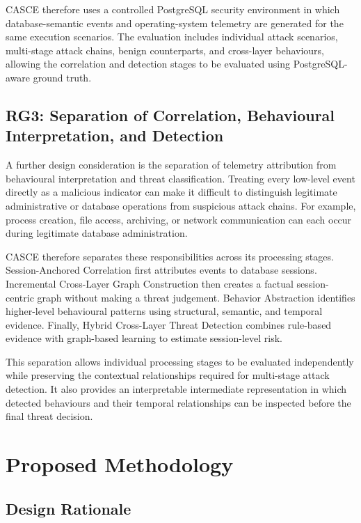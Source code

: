 \documentclass[conference]{IEEEtran}
\begin{document}
CASCE therefore uses a controlled PostgreSQL security environment in which database-semantic events and operating-system telemetry are generated for the same execution scenarios. The evaluation includes individual attack scenarios, multi-stage attack chains, benign counterparts, and cross-layer behaviours, allowing the correlation and detection stages to be evaluated using PostgreSQL-aware ground truth.

\subsection{RG3: Separation of Correlation, Behavioural Interpretation, and Detection}

A further design consideration is the separation of telemetry attribution from behavioural interpretation and threat classification. Treating every low-level event directly as a malicious indicator can make it difficult to distinguish legitimate administrative or database operations from suspicious attack chains. For example, process creation, file access, archiving, or network communication can each occur during legitimate database administration.

CASCE therefore separates these responsibilities across its processing stages. Session-Anchored Correlation first attributes events to database sessions. Incremental Cross-Layer Graph Construction then creates a factual session-centric graph without making a threat judgement. Behavior Abstraction identifies higher-level behavioural patterns using structural, semantic, and temporal evidence. Finally, Hybrid Cross-Layer Threat Detection combines rule-based evidence with graph-based learning to estimate session-level risk.

This separation allows individual processing stages to be evaluated independently while preserving the contextual relationships required for multi-stage attack detection. It also provides an interpretable intermediate representation in which detected behaviours and their temporal relationships can be inspected before the final threat decision.

\section{Proposed Methodology}
\label{sec:methodology}

\subsection{Design Rationale}
\end{document}
